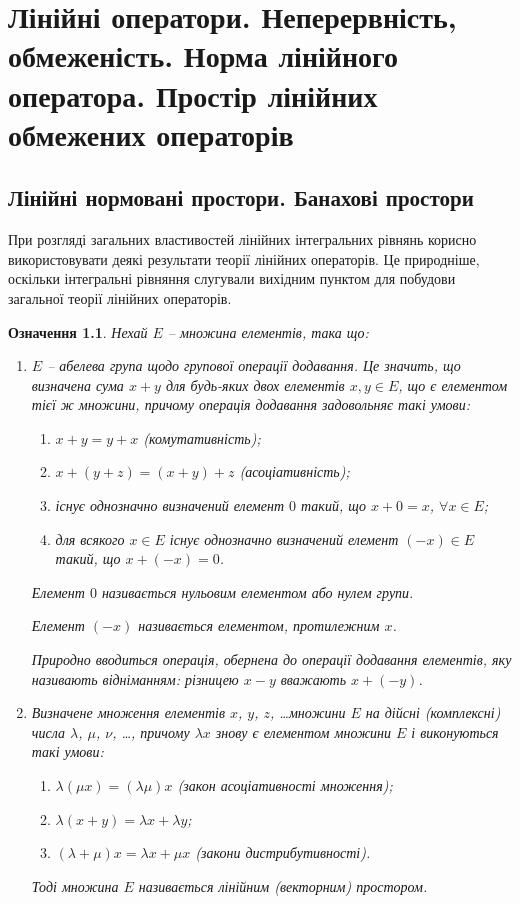 \documentclass[14pt,twoside]{extreport}
\theoremstyle{mystyle}
\newtheorem{dfn}{Означення}
\numberwithin{equation}{chapter}
\begin{document}
\chapter{Лінійні оператори. Неперервність, обмеженість. Норма лінійного оператора. Простір лінійних обмежених операторів}

\section{Лінійні нормовані простори. Банахові простори}

При розгляді загальних властивостей лінійних інтегральних рівнянь корисно використовувати деякі результати теорії лінійних операторів. Це природніше, оскільки інтегральні рівняння слугували вихідним пунктом для побудови загальної теорії лінійних операторів.

\begin{dfn}
	Нехай $E$ -- множина елементів, така що:
	\begin{enumerate}
		\item $E$ -- абелева група щодо групової операції додавання. Це значить, що визначена сума $x+y$ для будь-яких двох елементів $x, y \in E$, що є елементом тієї ж множини, причому операція додавання задовольняє такі умови:
		\begin{enumerate}
			\item $x + y = y + x$ (комутативність);
			\item $x + (y + z) = (x + y) + z$ (асоціативність);
			\item існує однозначно визначений елемент $0$ такий, що $x + 0 = x$, $\forall x \in E$;
			\item для всякого $x \in E$ існує однозначно визначений елемент $(-x) \in E$ такий, що $x + (-x) = 0$.
		\end{enumerate}
	    Елемент $0$ називається нульовим елементом або нулем групи.
	
	    Елемент $(-x)$ називається елементом, протилежним $x$.
	
	    Природно вводиться операція, обернена до операції додавання елементів, яку називають відніманням: різницею $x-y$ вважають $x+(-y)$.
	
	    \item Визначене множення елементів $x$, $y$, $z$, \ldots множини $E$ на дійсні (комплексні) числа $\lambda$, $\mu$, $\nu$, \ldots, причому $\lambda x$ знову є елементом множини $E$ і виконуються такі умови:
	    \begin{enumerate}
	    	\item $\lambda (\mu x) = (\lambda\mu) x$ (закон асоціативності множення);
	    	\item $\lambda (x + y) = \lambda x + \lambda y$;
	    	\item $(\lambda + \mu) x = \lambda x + \mu x$ (закони дистрибутивності).
	    \end{enumerate}
	    Тоді множина $E$ називається лінійним (векторним) простором.
	\end{enumerate}
\end{dfn}
\end{document}
